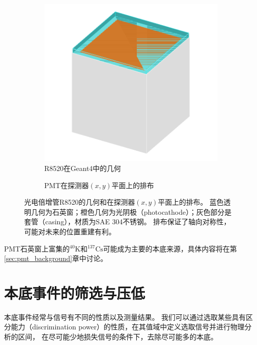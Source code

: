 \begin{figure}
  \begin{subfigure}{.5\textwidth}
    \centering
    \includegraphics[width=1.0\linewidth]{figures/pmt_geo.png}
    \caption{\label{fig:pmt_g4} R8520在Geant4中的几何}
  \end{subfigure}
  \begin{subfigure}{.5\textwidth}
    \centering
    
    \caption{\label{fig:pmt_layout} PMT在探测器$(x,y)$平面上的排布}
  \end{subfigure}
  \caption{\label{fig:pmt_geo} 光电倍增管R8520的几何和在探测器$(x,y)$平面上的排布。
  蓝色透明几何为石英窗；橙色几何为光阴极（photocathode）；灰色部分是套管（casing），材质为SAE 304不锈钢。
  排布保证了轴向对称性，可能对未来的位置重建有利。}
\end{figure}

PMT石英窗上富集的${}^{40}\mathrm{K}$和${}^{137}\mathrm{Cs}$可能成为主要的本底来源，具体内容将在第\ref{sec:pmt_background}章中讨论。

\section{本底事件的筛选与压低}

本底事件经常与信号有不同的性质以及测量结果。
我们可以通过选取某些具有区分能力（discrimination power）的性质，在其值域中定义选取信号并进行物理分析的区间，
在尽可能少地损失信号的条件下，去除尽可能多的本底。

